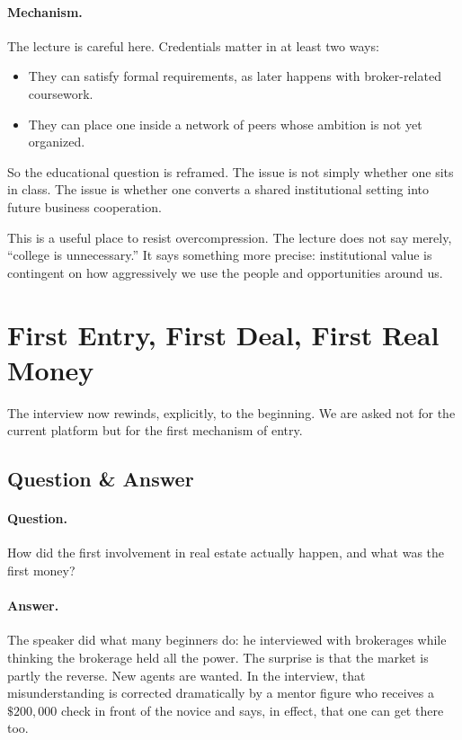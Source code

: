 \paragraph{Mechanism.}
The lecture is careful here. Credentials matter in at least two ways:
\begin{itemize}
\item They can satisfy formal requirements, as later happens with broker-related coursework.
\item They can place one inside a network of peers whose ambition is not yet organized.
\end{itemize}
So the educational question is reframed. The issue is not simply whether one sits in class. The issue is whether one converts a shared institutional setting into future business cooperation.

\begin{remark}
This is a useful place to resist overcompression. The lecture does not say merely, ``college is unnecessary.'' It says something more precise: institutional value is contingent on how aggressively we use the people and opportunities around us.
\end{remark}

\section{First Entry, First Deal, First Real Money}

The interview now rewinds, explicitly, to the beginning. We are asked not for the current platform but for the first mechanism of entry.

\subsection{Question \& Answer}

\paragraph{Question.}
How did the first involvement in real estate actually happen, and what was the first money?

\paragraph{Answer.}
The speaker did what many beginners do: he interviewed with brokerages while thinking the brokerage held all the power. The surprise is that the market is partly the reverse. New agents are wanted. In the interview, that misunderstanding is corrected dramatically by a mentor figure who receives a \(\$200{,}000\) check in front of the novice and says, in effect, that one can get there too.

